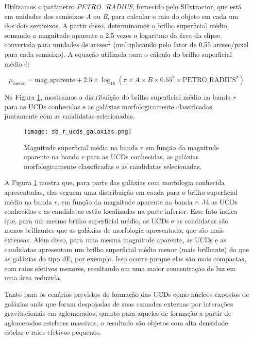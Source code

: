 Utilizamos o parâmetro \textit{PETRO\_RADIUS}, fornecido pelo SExtractor, que está em unidades dos semieixos \textit{A} ou \textit{B}, para calcular o raio do objeto em cada um dos dois semieixos. A partir disso, determinamos o brilho superficial médio, somando a magnitude aparente a 2,5 vezes o logaritmo da área da elipse, convertida para unidades de arcsec$^2$ (multiplicando pelo fator de 0,55 arcsec/pixel para cada semieixo). A equação utilizada para o cálculo do brilho superficial médio é:

\begin{equation}
    \mu_{\text{medio}} = \text{mag\_aparente} + 2.5 \times \log_{10}(\pi \times A \times B \times 0.55^2 \times \text{PETRO\_RADIUS}^2)
    \label{equation_sb}
\end{equation}

Na Figura \ref{sb_r_ucds_galaxias}, mostramos a distribuição do brilho superficial médio na banda $r$ para as UCDs conhecidas e as galáxias morfologicamente classificadas, juntamente com as candidatas selecionadas.

\begin{figure}[!ht]
    \begin{center}
    \texttt{[image: sb\_r\_ucds\_galaxias.png]}
    \caption[]{Magnitude superficial média na banda $r$ em função da magnitude aparente na banda $r$ para as UCDs conhecidas, as galáxias morfologicamente classificadas e as candidatas selecionadas.}
    \label{sb_r_ucds_galaxias}
    \end{center}
\end{figure}

A Figura \ref{sb_r_ucds_galaxias} mostra que, para parte das galáxias com morfologia conhecida apresentadas, elas seguem uma distribuição em cauda para o brilho superficial médio na banda $r$, em função da magnitude aparente na banda $r$. Já as UCDs conhecidas e as candidatas estão localizadas na parte inferior. Esse fato indica que, para um mesmo brilho superficial médio, as UCDs e as candidatas são menos brilhantes que as galáxias de morfologia apresentada, que são mais extensas. Além disso, para uma mesma magnitude aparente, as UCDs e as candidatas apresentam um brilho superficial médio menor (mais brilhante) do que as galáxias do tipo dE, por exemplo. Isso ocorre porque elas são mais compactas, com raios efetivos menores, resultando em uma maior concentração de luz em uma área reduzida.

Tanto para os cenários previstos de formação das UCDs como núcleos expostos de galáxias anãs que foram despojadas de suas camadas externas por interações gravitacionais em aglomerados, quanto para aqueles de formação a partir de aglomerados estelares massivos, o resultado são objetos com alta densidade estelar e raios efetivos pequenos.


